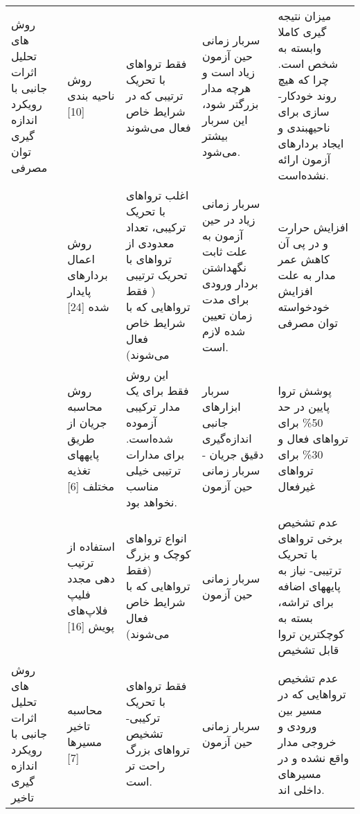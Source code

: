 \begin{table}
	\begin{tabular}{|p{1cm}||p{3cm}|p{3cm}|p{3cm}|p{3cm}|}
		روش ‌های تحلیل اثرات جانبی با رویکرد اندازه ‌گیری توان مصرفی&روش ناحیه بندی [10]  &فقط تروا‌های با تحریک ترتیبی که در شرایط خاص فعال می‌شوند &سربار زمانی حین آزمون زیاد است و هرچه مدار بزرگتر شود، این سربار بیشتر می‌شود. &میزان نتیجه گیری کاملا وابسته به شخص است. چرا که هیچ روند خودکار­سازی برای ناحیه­بندی و ایجاد بردارهای آزمون ارائه نشده‌است. 

		

		\\ \cline{2-5}
		&روش اعمال بردارهای پایدار شده [24]  &اغلب تروا‌های با تحریک ترکیبی، تعداد معدودی از تروا‌های با تحریک ترتیبی ( فقط تروا‌هایی که با شرایط خاص فعال می‌شوند)  &سربار زمانی زیاد در حین آزمون به علت ثابت نگهداشتن بردار ورودی برای مدت زمان تعیین شده لازم ‌است. &افزایش حرارت و در پی آن کاهش عمر مدار به علت افزایش خودخواسته توان مصرفی
		
		\\ \cline{2-5}
		& روش محاسبه جریان از طریق پایه­های تغذیه مختلف [6] &این روش فقط برای یک مدار ترکیبی آزموده شده‌است. برای مدارات ترتیبی خیلی مناسب نخواهد بود. & سربار ابزارهای جانبی اندازه‌گیری دقیق جریان - سربار زمانی حین آزمون&پوشش تروا پایین در حد 50\% برای تروا‌های فعال و 30\% برای تروا‌های غیرفعال 
		\\ \cline{2-5}
		& استفاده از ترتیب دهی مجدد فلیپ فلاپ‌های پویش [16] &انواع تروا‌های کوچک و بزرگ (فقط تروا‌هایی که با شرایط خاص فعال می‌شوند)  &سربار زمانی حین آزمون & عدم تشخیص برخی تروا‌های با تحریک ترتیبی- نیاز به پایه­های اضافه برای تراشه، بسته به کوچکترین تروا قابل تشخیص
		\\ \hline \hline
		
		روش ‌های تحلیل اثرات جانبی با رویکرد اندازه ‌گیری تاخیر& محاسبه تاخیر مسیرها [7] & فقط تروا‌های با تحریک ترکیبی- تشخیص تروا‌های بزرگ راحت تر است.& سربار زمانی حین آزمون&عدم تشخیص تروا‌هایی که در مسیر بین ورودی و خروجی مدار واقع نشده و در مسیرهای داخلی اند.
		\\ \cline{2-5}

		
		


\end{tabular}
\end{table}

